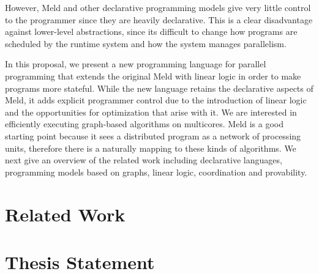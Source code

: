 However, Meld and other declarative programming models give very little control to the programmer since they are heavily declarative.
This is a clear disadvantage against lower-level abstractions, since its difficult to change how programs are scheduled by
the runtime system and how the system manages parallelism.

In this proposal, we present a new programming language for parallel programming that extends the
original Meld with linear logic in order to make programs more stateful. While the new language retains
the declarative aspects of Meld, it adds explicit programmer control
due to the introduction of linear logic and the opportunities for optimization that arise with it.
We are interested in efficiently executing graph-based algorithms on multicores. Meld is a good
starting point because it sees a distributed program as a network of processing units, therefore
there is a naturally mapping to these kinds of algorithms.
We next give an overview of the related work including declarative languages, programming models
based on graphs, linear logic, coordination and provability.

\section{Related Work}



\section{Thesis Statement}



